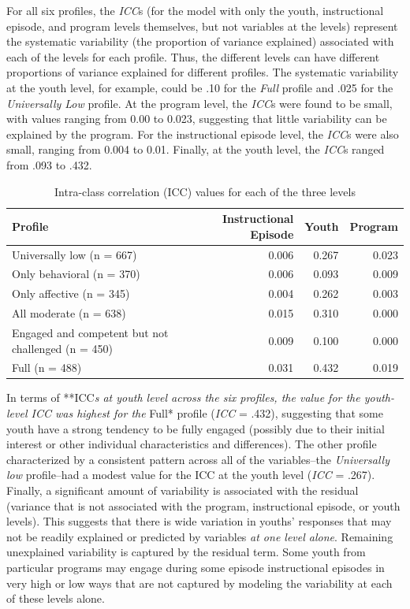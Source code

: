 \documentclass[]{msu-thesis}
\theoremstyle{definition}
\theoremstyle{definition}
\theoremstyle{definition}
\theoremstyle{remark}
\begin{document}
For all six profiles, the \emph{ICC}s (for the model with only the
youth, instructional episode, and program levels themselves, but not
variables at the levels) represent the systematic variability (the
proportion of variance explained) associated with each of the levels for
each profile. Thus, the different levels can have different proportions
of variance explained for different profiles. The systematic variability
at the youth level, for example, could be .10 for the \emph{Full}
profile and .025 for the \emph{Universally Low} profile. At the program
level, the \emph{ICC}s were found to be small, with values ranging from
0.00 to 0.023, suggesting that little variability can be explained by
the program. For the instructional episode level, the \emph{ICC}s were
also small, ranging from 0.004 to 0.01. Finally, at the youth level, the
\emph{ICC}s ranged from .093 to .432.

\begin{table}

\caption{\label{tab:unnamed-chunk-13}Intra-class correlation (ICC) values for each of the three levels}
\centering
\begin{tabular}[t]{lrrr}
\toprule
Profile & Instructional Episode & Youth & Program\\
\midrule
Universally low (n = 667) & 0.006 & 0.267 & 0.023\\
Only behavioral (n = 370) & 0.006 & 0.093 & 0.009\\
Only affective (n = 345) & 0.004 & 0.262 & 0.003\\
All moderate (n = 638) & 0.015 & 0.310 & 0.000\\
Engaged and competent but not challenged (n = 450) & 0.009 & 0.100 & 0.000\\
Full (n = 488) & 0.031 & 0.432 & 0.019\\
\bottomrule
\end{tabular}
\end{table}

In terms of **ICC\emph{s at youth level across the six profiles, the
value for the youth-level ICC was highest for the }Full* profile
(\emph{ICC} = .432), suggesting that some youth have a strong tendency
to be fully engaged (possibly due to their initial interest or other
individual characteristics and differences). The other profile
characterized by a consistent pattern across all of the variables--the
\emph{Universally low} profile--had a modest value for the ICC at the
youth level (\emph{ICC} = .267). Finally, a significant amount of
variability is associated with the residual (variance that is not
associated with the program, instructional episode, or youth levels).
This suggests that there is wide variation in youths' responses that may
not be readily explained or predicted by variables \emph{at one level
alone}. Remaining unexplained variability is captured by the residual
term. Some youth from particular programs may engage during some episode
instructional episodes in very high or low ways that are not captured by
modeling the variability at each of these levels alone.
\end{document}
